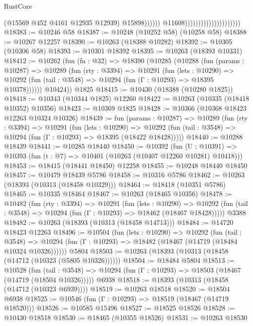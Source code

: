 \begin{lexlean}{RustCore}
\begin{coremodule}
                                                          (@15569 @452 @4161 @12935 @12939)
                                                          @15898))))))
                                              @11608)))))))))))))))))))))
@18383 := @10246 @58
@18387 := @10248 (@10252 @58) (@10258 @58)
@18388 := @10267 @12257
@18390 := @10263 (@18388 @10282)
@18392 := @10305 (@10306 @58)
@18393 := @10301 @18392
@18395 := @10263 (@18393 @10331)
@18412 := @10262
    (fun (fn : @32) =>
    @18390
      (@10285
        (@10288
          (fun (params : @10287) =>
          @10289
            (fun (rty : @3394) =>
            @10291
              (fun (lets : @10290) =>
              @10292 (fun (tail : @3548) => @10294 (fun (Γ : @10293) => @18395 @10378))))))
        @10424))
    @1825
@18415 := @10430 (@18388 (@10280 @1825))
@18418 := @10343 (@10344 @1825) @12260
@18422 := @10263 (@10335 (@18418 @10352) @10356)
@18423 := @10369 @1825
@18428 := @10366 (@10368 @18423 @12263 @10324 @10326)
@18439 := fun (params : @10287) =>
  @10289
    (fun (rty : @3394) =>
    @10291
      (fun (lets : @10290) =>
      @10292 (fun (tail : @3548) => @10294 (fun (Γ : @10293) => @18395 (@18422 @18428)))))
@18440 := @10288 @18439
@18441 := @10285 @18440
@18450 := @10392
    (fun (U : @10391) => @10393 (fun (t : @7) => @10401 (@10263 (@10407 @12260 @10281) @10418)))
@18453 := @18415 (@18441 @18450) @12258
@18455 := @10248 @18440 @18450
@18457 := @10479 @18439 @5786
@18458 := @10316 @5786
@18462 := @10263 (@18393 (@10313 (@18458 @10329)))
@18464 := @18418 (@10351 @5786)
@18465 := @10335 @18464
@18467 := @10263 (@18465 @10356)
@18478 := @10482
    (fun (rty : @3394) =>
    @10291
      (fun (lets : @10290) =>
      @10292 (fun (tail : @3548) => @10294 (fun (Γ : @10293) => @18462 (@18467 @18428)))))
    @3388
@18482 := @10263 (@18393 (@10313 (@18458 @14713)))
@18484 := @14720 @18423 @12263
@18496 := @10504
    (fun (lets : @10290) =>
    @10292
      (fun (tail : @3548) =>
      @10294 (fun (Γ : @10293) => @18482 (@18467 (@14719 (@18484 @10324 @10326))))))
    @5804
@18503 := @10263 (@18393 (@10313 (@18458 (@14712 (@10323 (@5805 @10326))))))
@18504 := @18484 @5804
@18513 := @10528
    (fun (tail : @3548) => @10294 (fun (Γ : @10293) => @18503 (@18467 (@14719 (@18504 @10326)))))
    @6938
@18518 := @18393 (@10313 (@18458 (@14712 (@10323 @6939))))
@18519 := @10263 @18518
@18520 := @18504 @6938
@18525 := @10546 (fun (Γ : @10293) => @18519 (@18467 (@14719 @18520)))
@18526 := @10585 @15496
@18527 := @18525 @18526
@18528 := @10430 @18518
@18530 := @18465 (@10355 @18526)
@18531 := @10263 @18530

\end{coremodule}
\end{lexlean}
